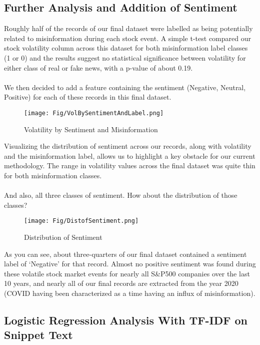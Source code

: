 \documentclass{article}
\begin{document}
\subsection{Further Analysis and Addition of Sentiment}

Roughly half of the records of our final dataset were labelled as being potentially related to misinformation during each stock event. A simple t-test compared our stock volatility column across this dataset for both misinformation label classes (1 or 0) and the results suggest no statistical significance between volatility for either class of real or fake news, with a p-value of about 0.19. 
\\\\
We then decided to add a feature containing the sentiment (Negative, Neutral, Positive) for each of these records in this final dataset.

\begin{figure}[H]
    \centering
    \texttt{[image: Fig/VolBySentimentAndLabel.png]}
    \caption{Volatility by Sentiment and Misinformation}
    \label{fig:sent1}
\end{figure}

Visualizing the distribution of sentiment across our records, along with volatility and the misinformation label, allows us to highlight a key obstacle for our current methodology. The range in volatility values across the final dataset was quite thin for both misinformation classes.
\\\\
And also, all three classes of sentiment. How about the distribution of those classes?

\begin{figure}[H]
    \centering
    \texttt{[image: Fig/DistofSentiment.png]}
    \caption{Distribution of Sentiment}
    \label{fig:sent2}
\end{figure}

As you can see, about three-quarters of our final dataset contained a sentiment label of ‘Negative’ for that record. Almost no positive sentiment was found during these volatile stock market events for nearly all S\&P500 companies over the last 10 years, and nearly all of our final records are extracted from the year 2020 (COVID having been characterized as a time having an influx of misinformation).

\subsection{Logistic Regression Analysis With TF-IDF on Snippet Text}
\end{document}
